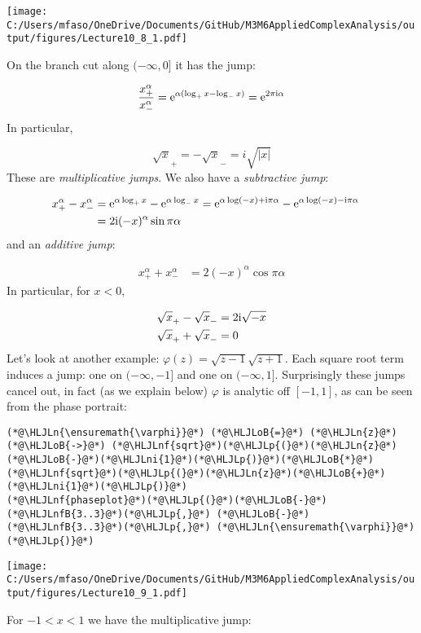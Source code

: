 \documentclass[12pt,a4paper]{article}
\newcommand{\HLJLn}[1]{#1}
\newcommand{\HLJLnf}[1]{\textcolor[RGB]{66,102,213}{#1}}
\newcommand{\HLJLnfB}[1]{\textcolor[RGB]{59,151,46}{#1}}
\newcommand{\HLJLni}[1]{\textcolor[RGB]{59,151,46}{#1}}
\newcommand{\HLJLoB}[1]{\textcolor[RGB]{102,102,102}{\textbf{#1}}}
\newcommand{\HLJLp}[1]{#1}
\def\I{ {\rm i} }
\def\E{ {\rm e} }
\begin{document}
\texttt{[image: C:/Users/mfaso/OneDrive/Documents/GitHub/M3M6AppliedComplexAnalysis/output/figures/Lecture10\_8\_1.pdf]}

On the branch cut  along $(-\infty,0]$ it has the jump:

\[
{x_+^\alpha \over x_-^\alpha} = \E^{\alpha (\log_+ x - \log_- x)} = \E^{2 \pi \I \alpha}
\]
In particular,

\[
\sqrt{x}_+ = -\sqrt{x}_- = i \sqrt{|x|}
\]
These are \emph{multiplicative jumps}. We also have a \emph{subtractive jump}:


\begin{align*}
x_+^\alpha - x_-^\alpha &= \E^{\alpha \log_+ x} - \E^{\alpha \log_- x} = \E^{\alpha \log(-x) + \I  \pi \alpha} - \E^{\alpha \log(-x) - \I \pi \alpha} \cr
    & = 2 \I (-x)^\alpha \sin \pi \alpha
\end{align*}
and an \emph{additive jump}:


\begin{align*}
x_+^\alpha + x_-^\alpha & = 2  (-x)^\alpha \cos \pi \alpha
\end{align*}
In particular, for $x < 0$,


\begin{align*}
\sqrt{x}_+ - \sqrt{x}_- &= 2 \I \sqrt{-x} \\
\sqrt{x}_+ + \sqrt{x}_- &= 0
\end{align*}
Let's look at another example: $\varphi(z) = \sqrt{z-1}\sqrt{z+1}$. Each square root term induces a jump: one on $(-\infty,-1]$ and one on $(-\infty,1]$. Surprisingly these jumps cancel out, in fact (as we explain below) $\varphi$ is analytic off $[-1,1]$, as can be seen from the phase portrait:


\begin{lstlisting}
(*@\HLJLn{\ensuremath{\varphi}}@*) (*@\HLJLoB{=}@*) (*@\HLJLn{z}@*) (*@\HLJLoB{->}@*) (*@\HLJLnf{sqrt}@*)(*@\HLJLp{(}@*)(*@\HLJLn{z}@*)(*@\HLJLoB{-}@*)(*@\HLJLni{1}@*)(*@\HLJLp{)}@*)(*@\HLJLoB{*}@*)(*@\HLJLnf{sqrt}@*)(*@\HLJLp{(}@*)(*@\HLJLn{z}@*)(*@\HLJLoB{+}@*)(*@\HLJLni{1}@*)(*@\HLJLp{)}@*)
(*@\HLJLnf{phaseplot}@*)(*@\HLJLp{(}@*)(*@\HLJLoB{-}@*)(*@\HLJLnfB{3..3}@*)(*@\HLJLp{,}@*) (*@\HLJLoB{-}@*)(*@\HLJLnfB{3..3}@*)(*@\HLJLp{,}@*) (*@\HLJLn{\ensuremath{\varphi}}@*)(*@\HLJLp{)}@*)
\end{lstlisting}

\texttt{[image: C:/Users/mfaso/OneDrive/Documents/GitHub/M3M6AppliedComplexAnalysis/output/figures/Lecture10\_9\_1.pdf]}

For $-1 < x < 1$ we have the multiplicative jump:
\end{document}
